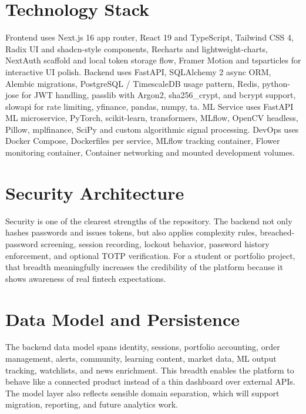 \documentclass[11pt,a4paper]{article}
\begin{document}
\section{Technology Stack}
Frontend uses Next.js 16 app router, React 19 and TypeScript, Tailwind CSS 4, Radix UI and shadcn-style components, Recharts and lightweight-charts, NextAuth scaffold and local token storage flow, Framer Motion and tsparticles for interactive UI polish. Backend uses FastAPI, SQLAlchemy 2 async ORM, Alembic migrations, PostgreSQL / TimescaleDB usage pattern, Redis, python-jose for JWT handling, passlib with Argon2, sha256\_crypt, and bcrypt support, slowapi for rate limiting, yfinance, pandas, numpy, ta. ML Service uses FastAPI ML microservice, PyTorch, scikit-learn, transformers, MLflow, OpenCV headless, Pillow, mplfinance, SciPy and custom algorithmic signal processing. DevOps uses Docker Compose, Dockerfiles per service, MLflow tracking container, Flower monitoring container, Container networking and mounted development volumes.
\section{Security Architecture}
Security is one of the clearest strengths of the repository. The backend not only hashes passwords and issues tokens, but also applies complexity rules, breached-password screening, session recording, lockout behavior, password history enforcement, and optional TOTP verification. For a student or portfolio project, that breadth meaningfully increases the credibility of the platform because it shows awareness of real fintech expectations.
\section{Data Model and Persistence}
The backend data model spans identity, sessions, portfolio accounting, order management, alerts, community, learning content, market data, ML output tracking, watchlists, and news enrichment. This breadth enables the platform to behave like a connected product instead of a thin dashboard over external APIs. The model layer also reflects sensible domain separation, which will support migration, reporting, and future analytics work.
\end{document}
